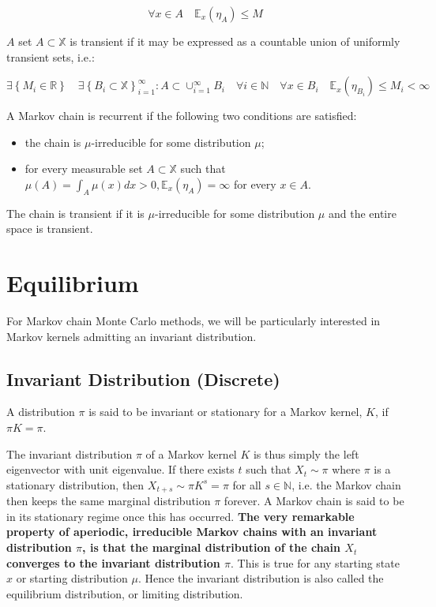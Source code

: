 \documentclass[10pt]{article}
\begin{document}
$$
\forall x \in A \quad \mathbb{E}_{x}\left(\eta_{A}\right) \leq M
$$

$A$ set $A \subset \mathbb{X}$ is transient if it may be expressed as a countable union of uniformly transient sets, i.e.:

$$
\exists\left\{M_{i} \in \mathbb{R}\right\} \quad \exists\left\{B_{i} \subset \mathbb{X}\right\}_{i=1}^{\infty}: A \subset \cup_{i=1}^{\infty} B_{i} \quad \forall i \in \mathbb{N} \quad \forall x \in B_{i} \quad \mathbb{E}_{x}\left(\eta_{B_{i}}\right) \leq M_{i}<\infty
$$

A Markov chain is recurrent if the following two conditions are satisfied:

\begin{itemize}
  \item the chain is $\mu$-irreducible for some distribution $\mu$;
  \item for every measurable set $A \subset \mathbb{X}$ such that $\mu(A)=\int_{A} \mu(x) d x>0, \mathbb{E}_{x}\left(\eta_{A}\right)=\infty$ for every $x \in A$.
\end{itemize}

The chain is transient if it is $\mu$-irreducible for some distribution $\mu$ and the entire space is transient.

\section{Equilibrium}
For Markov chain Monte Carlo methods, we will be particularly interested in Markov kernels admitting an invariant distribution.
\subsection{Invariant Distribution (Discrete)}
A distribution $\pi$ is said to be invariant or stationary for a Markov kernel, $K$, if $\pi K=\pi$.

The invariant distribution $\pi$ of a Markov kernel $K$ is thus simply the left eigenvector with unit eigenvalue. If there exists $t$ such that $X_{t} \sim \pi$ where $\pi$ is a stationary distribution, then $X_{t+s} \sim \pi K^{s}=\pi$ for all $s \in \mathbb{N}$, i.e. the Markov chain then keeps the same marginal distribution $\pi$ forever. A Markov chain is said to be in its stationary regime once this has occurred.
\textbf{The very remarkable property of \textbf{aperiodic}, \textbf{irreducible} Markov chains with an invariant distribution $\pi$, is that the marginal distribution of the chain $X_{t}$ converges to the invariant distribution $\pi$}. This is true for any starting state $x$ or starting distribution $\mu$. Hence the invariant distribution is also called the equilibrium distribution, or limiting distribution.
\end{document}
